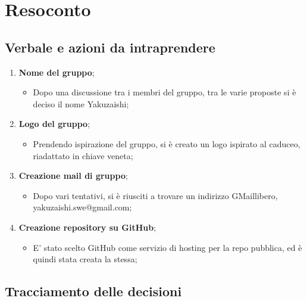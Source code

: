 \section{Resoconto}
\subsection{Verbale e azioni da intraprendere}

\begin{enumerate}
	\item \textbf{Nome del gruppo};
	\begin{itemize}
		\item Dopo una discussione tra i membri del gruppo, tra le varie proposte si è deciso il nome Yakuzaishi;
	\end{itemize}
	\item \textbf{Logo del gruppo};
	\begin{itemize}
		\item Prendendo ispirazione del gruppo, si è creato un logo ispirato al caduceo\glo, riadattato in chiave veneta;
	\end{itemize}
	\item \textbf{Creazione mail di gruppo};
	\begin{itemize}
		\item Dopo vari tentativi, si è riusciti a trovare un indirizzo GMail\glo libero, yakuzaishi.swe@gmail.com;
	\end{itemize}
	\item \textbf{Creazione repository su GitHub};
	\begin{itemize}
		\item E' stato scelto GitHub come servizio di hosting per la repo pubblica, ed è quindi stata creata la stessa;
	\end{itemize}

\end{enumerate}

\pagebreak

\subsection{Tracciamento delle decisioni}

